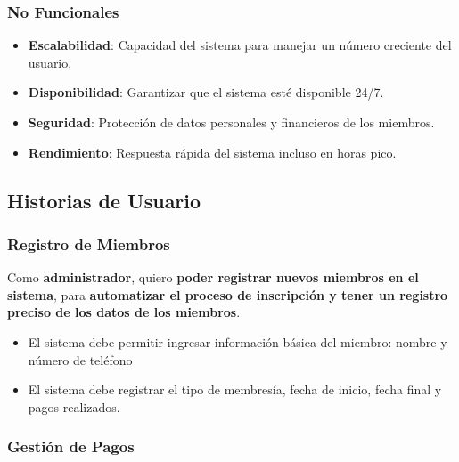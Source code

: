 \documentclass[spanish, 12pt]{article}
\providecommand{\tightlist}{\setlength{\itemsep}{0pt}
\setlength{\parskip}{0pt}}
\begin{document}
	\subsubsection{No Funcionales}
	\label{no-funcionales}

	\begin{itemize}
		\tightlist

		\item \textbf{Escalabilidad}: Capacidad del sistema para manejar un número creciente
			del usuario.

		\item \textbf{Disponibilidad}: Garantizar que el sistema esté disponible 24/7.

		\item \textbf{Seguridad}: Protección de datos personales y financieros de los
			miembros.

		\item \textbf{Rendimiento}: Respuesta rápida del sistema incluso en horas pico.
	\end{itemize}

	\subsection{Historias de Usuario}
	\label{historias-de-usuario-1}

	\subsubsection{Registro de Miembros}
	\label{registro-de-miembros}

	Como \textbf{administrador}, quiero \textbf{poder registrar nuevos miembros en
	el sistema}, para \textbf{automatizar el proceso de inscripción y tener un
	registro preciso de los datos de los miembros}.

	\begin{itemize}
		\tightlist

		\item El sistema debe permitir ingresar información básica del miembro:
			nombre y número de teléfono

		\item El sistema debe registrar el tipo de membresía, fecha de inicio, fecha
			final y pagos realizados.
	\end{itemize}

	\subsubsection{Gestión de Pagos}
	\label{gestiuxf3n-de-pagos}
\end{document}
